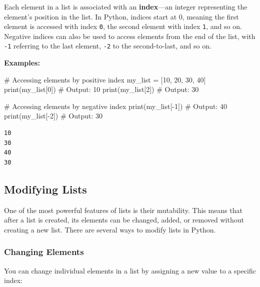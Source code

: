 \documentclass[
  letterpaper,
  DIV=11,
  numbers=noendperiod]{scrreprt}
\newenvironment{Shaded}{\begin{snugshade}}{\end{snugshade}}
\newcommand{\BuiltInTok}[1]{\textcolor[rgb]{0.00,0.23,0.31}{#1}}
\newcommand{\CommentTok}[1]{\textcolor[rgb]{0.37,0.37,0.37}{#1}}
\newcommand{\DecValTok}[1]{\textcolor[rgb]{0.68,0.00,0.00}{#1}}
\newcommand{\NormalTok}[1]{\textcolor[rgb]{0.00,0.23,0.31}{#1}}
\newcommand{\OperatorTok}[1]{\textcolor[rgb]{0.37,0.37,0.37}{#1}}
\begin{document}
Each element in a list is associated with an \textbf{index}---an integer
representing the element's position in the list. In Python, indices
start at 0, meaning the first element is accessed with index \texttt{0},
the second element with index \texttt{1}, and so on. Negative indices
can also be used to access elements from the end of the list, with
\texttt{-1} referring to the last element, \texttt{-2} to the
second-to-last, and so on.

\textbf{Examples:}

\begin{Shaded}
\begin{Highlighting}[]
\CommentTok{\# Accessing elements by positive index}
\NormalTok{my\_list }\OperatorTok{=}\NormalTok{ [}\DecValTok{10}\NormalTok{, }\DecValTok{20}\NormalTok{, }\DecValTok{30}\NormalTok{, }\DecValTok{40}\NormalTok{]}
\BuiltInTok{print}\NormalTok{(my\_list[}\DecValTok{0}\NormalTok{])  }\CommentTok{\# Output: 10}
\BuiltInTok{print}\NormalTok{(my\_list[}\DecValTok{2}\NormalTok{])  }\CommentTok{\# Output: 30}

\CommentTok{\# Accessing elements by negative index}
\BuiltInTok{print}\NormalTok{(my\_list[}\OperatorTok{{-}}\DecValTok{1}\NormalTok{])  }\CommentTok{\# Output: 40}
\BuiltInTok{print}\NormalTok{(my\_list[}\OperatorTok{{-}}\DecValTok{2}\NormalTok{])  }\CommentTok{\# Output: 30}
\end{Highlighting}
\end{Shaded}

\begin{verbatim}
10
30
40
30
\end{verbatim}

\hypertarget{modifying-lists}{%
\subsection{Modifying Lists}\label{modifying-lists}}

One of the most powerful features of lists is their mutability. This
means that after a list is created, its elements can be changed, added,
or removed without creating a new list. There are several ways to modify
lists in Python.

\hypertarget{changing-elements}{%
\subsubsection{Changing Elements}\label{changing-elements}}

You can change individual elements in a list by assigning a new value to
a specific index:
\end{document}
